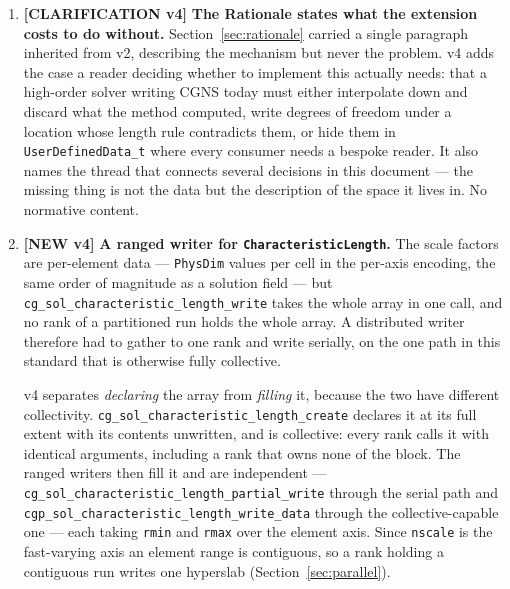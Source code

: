 \documentclass[11pt,letterpaper]{article}
\newif\ifvfourdraft
\newenvironment{v4block}{\ifvfourdraft\color{v4violet}\fi\ignorespaces}{\par}
\newcommand{\NEWIV}{\ifvfourdraft
  \textcolor{v4violet}{\textbf{[NEW v4]}}\else
  \textcolor{newgreen}{\textbf{[NEW v4]}}\fi}
\newcommand{\CLARIFYIV}{\ifvfourdraft
  \textcolor{v4violet}{\textbf{[CLARIFICATION v4]}}\else
  \textcolor{clarifybrown}{\textbf{[CLARIFICATION v4]}}\fi}
\begin{document}
{\begin{v4block}
\begin{enumerate}[leftmargin=1.4em,itemsep=0.5em]
    The third is an \emph{upper bound}, deliberately.  An earlier review asked for
    equality against \texttt{cg\_solution\_lagrange\_interpolation\_size}; that
    would reject the serendipity spaces this standard supports, since an
    edge-serendipity \texttt{QUAD} at $p=2$ carries $4p=8$ control points against
    a complete-space $(p+1)^2=9$.  A set larger than the complete space cannot be
    unisolvent for a degree-$p$ space and is always an error; a smaller one is an
    incomplete space and is legal.  \textit{Impact:} none to conformant files.

  \item \CLARIFYIV{} \textbf{The Rationale states what the extension costs to do
    without.}  Section~\ref{sec:rationale} carried a single paragraph inherited
    from v2, describing the mechanism but never the problem.  v4 adds the case a
    reader deciding whether to implement this actually needs: that a high-order
    solver writing CGNS today must either interpolate down and discard what the
    method computed, write degrees of freedom under a location whose length rule
    contradicts them, or hide them in \texttt{UserDefinedData\_t} where every
    consumer needs a bespoke reader.  It also names the thread that connects
    several decisions in this document --- the missing thing is not the data but
    the description of the space it lives in.  No normative content.

  \item \NEWIV{} \textbf{A ranged writer for \texttt{CharacteristicLength}.}
    The scale factors are per-element data --- \texttt{PhysDim} values per cell in
    the per-axis encoding, the same order of magnitude as a solution field --- but
    \texttt{cg\_sol\_characteristic\_length\_write} takes the whole array in one
    call, and no rank of a partitioned run holds the whole array.  A distributed
    writer therefore had to gather to one rank and write serially, on the one path
    in this standard that is otherwise fully collective.

    v4 separates \emph{declaring} the array from \emph{filling} it, because the
    two have different collectivity.
    \texttt{cg\_sol\_characteristic\_length\_create} declares it at its full
    extent with its contents unwritten, and is collective: every rank calls it
    with identical arguments, including a rank that owns none of the block.  The
    ranged writers then fill it and are independent ---
    \texttt{cg\_sol\_characteristic\_length\_partial\_write} through the serial
    path and \texttt{cgp\_sol\_characteristic\_length\_write\_data} through the
    collective-capable one --- each taking \texttt{rmin} and \texttt{rmax} over
    the element axis.  Since \texttt{nscale} is the fast-varying axis an element
    range is contiguous, so a rank holding a contiguous run writes one hyperslab
    (Section~\ref{sec:parallel}).


\end{enumerate}
\end{v4block}}
\end{document}
